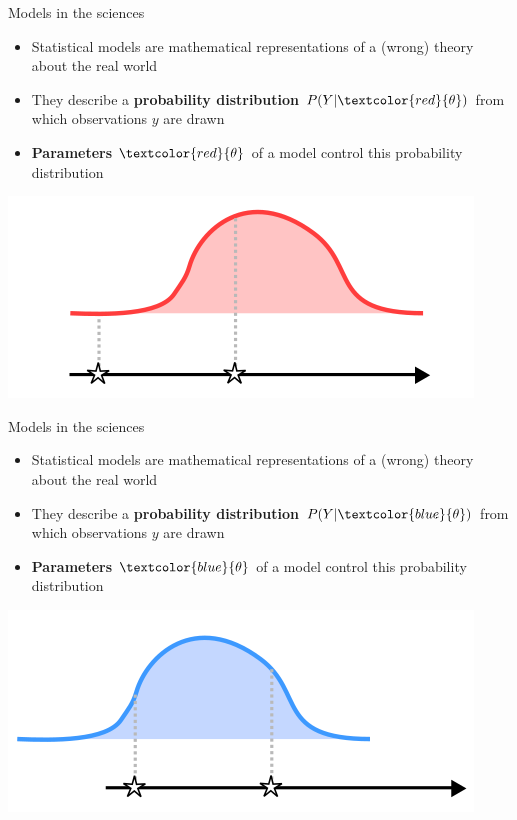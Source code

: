 \documentclass[10pt]{beamer}
\begin{document}
\begin{frame}{Models in the sciences}
  \begin{itemize}
   \item Statistical models are mathematical representations of a (wrong) theory about the real world
   \item They describe a \textbf{probability distribution} $P(Y|\textcolor{red}{\theta})$ from which observations $y$ are drawn
   \item \textbf{Parameters} $\textcolor{red}{\theta}$ of a model control this probability distribution
  \end{itemize}
  \centering
      \includegraphics[width=.8\textwidth]{camria-prob-3.png}
\end{frame}
\begin{frame}{Models in the sciences}
  \begin{itemize}
   \item Statistical models are mathematical representations of a (wrong) theory about the real world
   \item They describe a \textbf{probability distribution} $P(Y|\textcolor{blue}{\theta})$ from which observations $y$ are drawn
   \item \textbf{Parameters} $\textcolor{blue}{\theta}$ of a model control this probability distribution
  \end{itemize}
  \centering
      \includegraphics[width=.8\textwidth]{camria-prob-4.png}
\end{frame}
\end{document}
